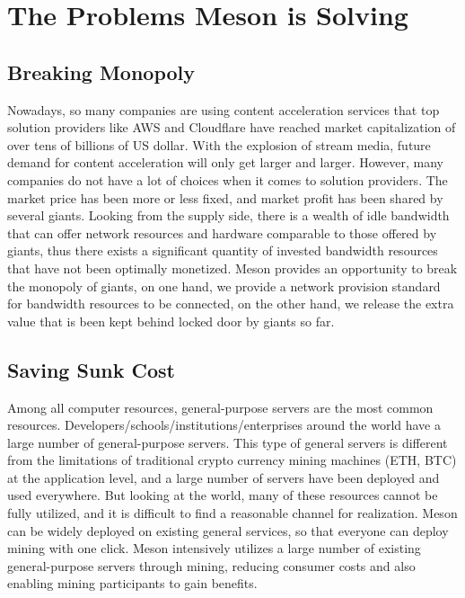\documentclass[12pt, a4paper, unicode]{report}
\begin{document}
    \chapter{The Problems Meson is Solving}
    
    \section{Breaking Monopoly}
    Nowadays, so many companies are using content acceleration services that top solution providers like AWS and Cloudflare have reached market capitalization of over tens of billions of US dollar. With the explosion of stream media, future demand for content acceleration will only get larger and larger. However, many companies do not have a lot of choices when it comes to solution providers. The market price has been more or less fixed, and market profit has been shared by several giants. Looking from the supply side, there is a wealth of idle bandwidth that can offer network resources and hardware comparable to those offered by giants, thus there exists a significant quantity of invested bandwidth resources that have not been optimally monetized. Meson provides an opportunity to break the monopoly of giants, on one hand, we provide a network provision standard for bandwidth resources to be connected, on the other hand, we release the extra value that is been kept behind locked door by giants so far.

    \section{Saving Sunk Cost}
    
    Among all computer resources, general-purpose servers are the most common resources. Developers/schools/institutions/enterprises around the world have a large number of general-purpose servers. This type of general servers is different from the limitations of traditional crypto currency mining machines (ETH, BTC) at the application level, and a large number of servers have been deployed and used everywhere. But looking at the world, many of these resources cannot be fully utilized, and it is difficult to find a reasonable channel for realization. Meson can be widely deployed on existing general services, so that everyone can deploy mining with one click. Meson intensively utilizes a large number of existing general-purpose servers through mining, reducing consumer costs and also enabling mining participants to gain benefits.
    
\end{document}

